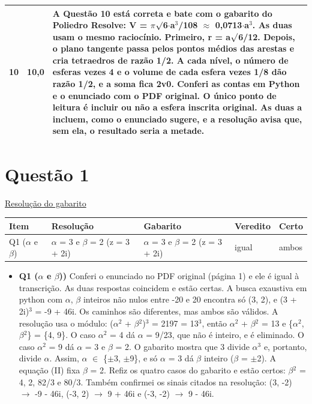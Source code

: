 \documentclass{article}%
\begin{document}
\begin{longtable}{@{}c c p{}@{}}
10 & 10,0 & A Questão 10 está correta e bate com o gabarito do Poliedro Resolve: V = $\pi$$\surd$6$\cdot$a$^3$/108 $\approx$ 0,0713$\cdot$a$^3$. As duas usam o mesmo raciocínio. Primeiro, r = a$\surd$6/12. Depois, o plano tangente passa pelos pontos médios das arestas e cria tetraedros de razão 1/2. A cada nível, o número de esferas vezes 4 e o volume de cada esfera vezes 1/8 dão razão 1/2, e a soma fica 2v0. Conferi as contas em Python e o enunciado com o PDF original. O único ponto de leitura é incluir ou não a esfera inscrita original. As duas a incluem, como o enunciado sugere, e a resolução avisa que, sem ela, o resultado seria a metade. \\
\bottomrule\end{longtable}%
\section*{Questão 1}%
\href{https://poliedroresolve.sistemapoliedro.com.br/vestibulares/ime/2026/ime-2-fase-dia-1-23-10-2025-2-fase-dia-1/dissertativa-1-matematica-2-fase-dia-1-ime-2026}{Resolução do gabarito}\par\smallskip%
\begin{longtable}{@{}p{} p{} p{} p{} p{}@{}}\toprule Item & Resolução & Gabarito & Veredito & Certo \\ \midrule
Q1 ($\alpha$ e $\beta$) & $\alpha$ = 3 e $\beta$ = 2 (z = 3 + 2i) & $\alpha$ = 3 e $\beta$ = 2 (z = 3 + 2i) & igual & ambos \\
\bottomrule\end{longtable}%
\begin{itemize}%
\item%
\textbf{Q1 ($\alpha$ e $\beta$))} Conferi o enunciado no PDF original (página 1) e ele é igual à transcrição. As duas respostas coincidem e estão certas. A busca exaustiva em python com $\alpha$, $\beta$ inteiros não nulos entre -20 e 20 encontra só (3, 2), e (3 + 2i)$^3$ = -9 + 46i. Os caminhos são diferentes, mas ambos são válidos. A resolução usa o módulo: ($\alpha$$^2$ + $\beta$$^2$)$^3$ = 2197 = 13$^3$, então $\alpha$$^2$ + $\beta$$^2$ = 13 e \{$\alpha$$^2$, $\beta$$^2$\} = \{4, 9\}. O caso $\alpha$$^2$ = 4 dá $\alpha$ = 9/23, que não é inteiro, e é eliminado. O caso $\alpha$$^2$ = 9 dá $\alpha$ = 3 e $\beta$ = 2. O gabarito mostra que 3 divide $\alpha$$^3$ e, portanto, divide $\alpha$. Assim, $\alpha$ $\in$ \{$\pm$3, $\pm$9\}, e só $\alpha$ = 3 dá $\beta$ inteiro ($\beta$ = $\pm$2). A equação (II) fixa $\beta$ = 2. Refiz os quatro casos do gabarito e estão certos: $\beta$$^2$ = 4, 2, 82/3 e 80/3. Também confirmei os sinais citados na resolução: (3, -2) $\to$ -9 - 46i, (-3, 2) $\to$ 9 + 46i e (-3, -2) $\to$ 9 - 46i.%
\end{itemize}%
\end{document}
